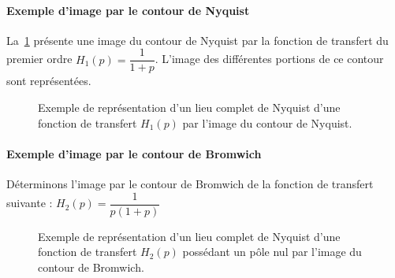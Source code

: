 \paragraph{Exemple d'image par le contour de Nyquist}
La~\cref{fig-nyquist_complet_image_exemple1} présente une image du contour
de Nyquist par la fonction de transfert du premier ordre 
$H_1(p)=\dfrac{1}{1+p}$. L'image des différentes portions de ce contour 
sont représentées.
\begin{figure}[!h]
    \centering
    
    \caption{Exemple de représentation d'un lieu complet de Nyquist d'une 
             fonction de transfert $H_1(p)$ par l'image du contour de 
             Nyquist. \label{fig-nyquist_complet_image_exemple1}}
\end{figure}
\paragraph{Exemple d'image par le contour de Bromwich}
Déterminons l'image par le contour de Bromwich de la fonction de transfert 
suivante : $H_2(p)=\dfrac{1}{p(1+p)}$
\begin{figure}[!h]
    \centering
    
    \caption{Exemple de représentation d'un lieu complet de Nyquist 
             d'une fonction de transfert $H_2(p)$ possédant un pôle nul par 
             l'image du contour de Bromwich. 
    \label{fig-bromwich_complet_image_exemple1} }
\end{figure}
